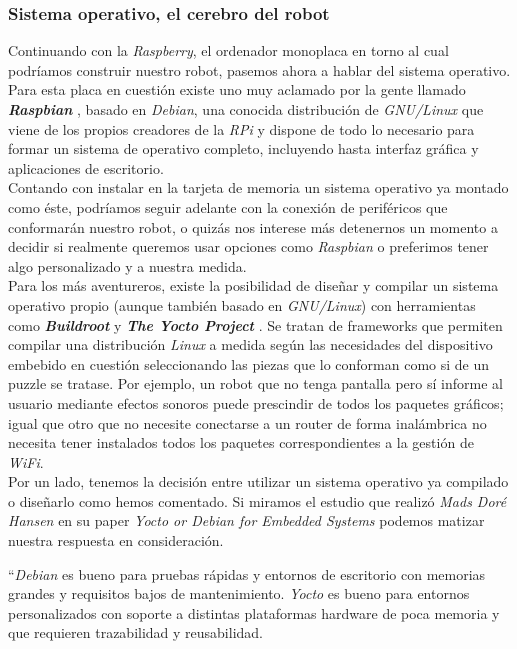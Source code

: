 \subsubsection{Sistema operativo, el cerebro del robot}

Continuando con la \textit{Raspberry}, el ordenador monoplaca en torno al cual podríamos construir nuestro robot, pasemos ahora a hablar del sistema operativo. Para esta placa en cuestión existe uno muy aclamado por la gente llamado \textbf{\textit{Raspbian}} \cite{raspbian}, basado en \textit{Debian}, una conocida distribución de \textit{GNU/Linux} que viene de los propios creadores de la \textit{RPi} y dispone de todo lo necesario para formar un sistema de operativo completo, incluyendo hasta interfaz gráfica y aplicaciones de escritorio.\\

Contando con instalar en la tarjeta de memoria un sistema operativo ya montado como éste, podríamos seguir adelante con la conexión de periféricos que conformarán nuestro robot, o quizás nos interese más detenernos un momento a decidir si realmente queremos usar opciones como \textit{Raspbian} o preferimos tener algo personalizado y a nuestra medida.\\

Para los más aventureros, existe la posibilidad de diseñar y compilar un sistema operativo propio (aunque también basado en \textit{GNU/Linux}) con herramientas como \textbf{\textit{Buildroot}} \cite{buildroot} y \textbf{\textit{The Yocto Project}} \cite{yocto-project}. Se tratan de frameworks que permiten compilar una distribución \textit{Linux} a medida según las necesidades del dispositivo embebido en cuestión seleccionando las piezas que lo conforman como si de un puzzle se tratase. Por ejemplo, un robot que no tenga pantalla pero sí informe al usuario mediante efectos sonoros puede prescindir de todos los paquetes gráficos; igual que otro que no necesite conectarse a un router de forma inalámbrica no necesita tener instalados todos los paquetes correspondientes a la gestión de \textit{WiFi}.\\

Por un lado, tenemos la decisión entre utilizar un sistema operativo ya compilado o diseñarlo como hemos comentado. Si miramos el estudio que realizó \textit{Mads Doré Hansen} en su paper \textit{Yocto or Debian for Embedded Systems} \cite{yocto-or-debian} podemos matizar nuestra respuesta en consideración.

\begin{displayquote}
	``\textit{Debian} es bueno para pruebas rápidas y entornos de escritorio con memorias grandes y requisitos bajos de mantenimiento. \textit{Yocto} es bueno para entornos personalizados con soporte a distintas plataformas hardware de poca memoria y que requieren trazabilidad y reusabilidad.
\end{displayquote}

